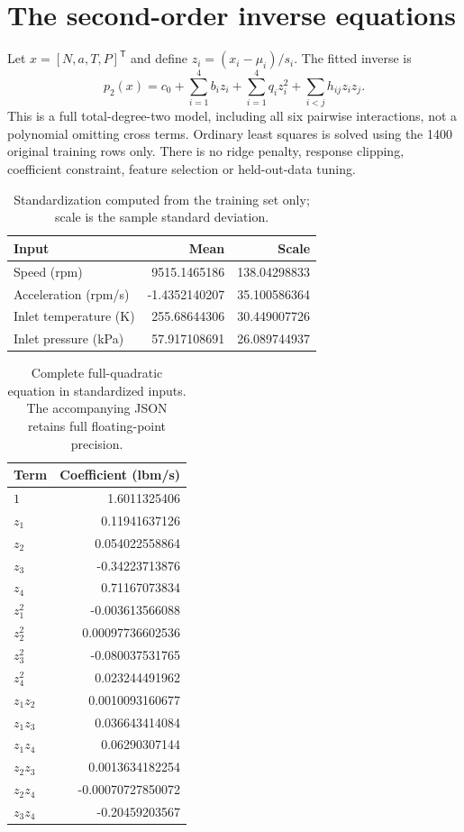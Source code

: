 \documentclass[11pt,a4paper]{article}
\begin{document}
\section{The second-order inverse equations}
Let $x=[N,a,T,P]^\mathsf{T}$ and define $z_i=(x_i-\mu_i)/s_i$. The fitted inverse is
\begin{equation}
p_2(x)=c_0+\sum_{i=1}^{4}b_i z_i+\sum_{i=1}^{4}q_i z_i^2+\sum_{i<j}h_{ij}z_i z_j.
\end{equation}
This is a full total-degree-two model, including all six pairwise interactions, not a polynomial omitting cross terms. Ordinary least squares is solved using the 1400 original training rows only. There is no ridge penalty, response clipping, coefficient constraint, feature selection or held-out-data tuning.
\begin{table}[H]\centering\small\begin{tabular}{lrr}\toprule
Input & Mean & Scale\\\midrule
Speed (rpm) & 9515.1465186 & 138.04298833\\
Acceleration (rpm/s) & -1.4352140207 & 35.100586364\\
Inlet temperature (K) & 255.68644306 & 30.449007726\\
Inlet pressure (kPa) & 57.917108691 & 26.089744937\\
\bottomrule\end{tabular}\caption{Standardization computed from the training set only; scale is the sample standard deviation.}\end{table}
\begin{table}[H]\centering\small\begin{tabular}{lr}\toprule
Term & Coefficient (lbm/s)\\\midrule
$1$ & 1.6011325406\\
$z_1$ & 0.11941637126\\
$z_2$ & 0.054022558864\\
$z_3$ & -0.34223713876\\
$z_4$ & 0.71167073834\\
$z_1^2$ & -0.003613566088\\
$z_2^2$ & 0.00097736602536\\
$z_3^2$ & -0.080037531765\\
$z_4^2$ & 0.023244491962\\
$z_1z_2$ & 0.0010093160677\\
$z_1z_3$ & 0.036643414084\\
$z_1z_4$ & 0.06290307144\\
$z_2z_3$ & 0.0013634182254\\
$z_2z_4$ & -0.00070727850072\\
$z_3z_4$ & -0.20459203567\\
\bottomrule\end{tabular}\caption{Complete full-quadratic equation in standardized inputs. The accompanying JSON retains full floating-point precision.}\end{table}
\clearpage
\end{document}
